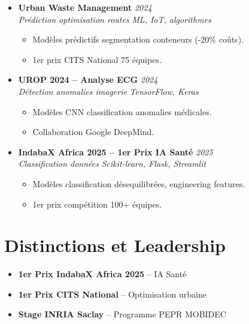 \documentclass[a4paper,11pt]{article}
\begin{document}
\begin{itemize}[leftmargin=0.5cm, nosep]
    \item \textbf{Urban Waste Management} \hfill \textit{2024} \\
    \textit{Pr\'ediction optimisation routes} \hfill \textit{ML, IoT, algorithmes}
    \vspace{-2pt}
    \begin{itemize}[leftmargin=0.4cm, nosep, label=\tiny$\bullet$]
        \item \small{Mod\`eles pr\'edictifs segmentation conteneurs (-20\% co\^uts).}
        \item \small{1er prix CITS National 75 \'equipes.}
    \end{itemize}
    \vspace{3pt}

    \item \textbf{UROP 2024 -- Analyse ECG} \hfill \textit{2024} \\
    \textit{D\'etection anomalies imagerie} \hfill \textit{TensorFlow, Keras}
    \vspace{-2pt}
    \begin{itemize}[leftmargin=0.4cm, nosep, label=\tiny$\bullet$]
        \item \small{Mod\`eles CNN classification anomalies m\'edicales.}
        \item \small{Collaboration Google DeepMind.}
    \end{itemize}
    \vspace{3pt}

    \item \textbf{IndabaX Africa 2025 -- 1er Prix IA Sant\'e} \hfill \textit{2025} \\
    \textit{Classification donn\'ees} \hfill \textit{Scikit-learn, Flask, Streamlit}
    \vspace{-2pt}
    \begin{itemize}[leftmargin=0.4cm, nosep, label=\tiny$\bullet$]
        \item \small{Mod\`eles classification d\'esequilibr\'ees, engineering features.}
        \item \small{1er prix comp\'etition 100+ \'equipes.}
    \end{itemize}
\end{itemize}

\section{Distinctions et Leadership}
\begin{itemize}[leftmargin=0.5cm, nosep]
    \item \textbf{1er Prix IndabaX Africa 2025} -- IA Sant\'e
    \item \textbf{1er Prix CITS National} -- Optimisation urbaine
    \item \textbf{Stage INRIA Saclay} -- Programme PEPR MOBIDEC
\end{itemize}
\end{document}

